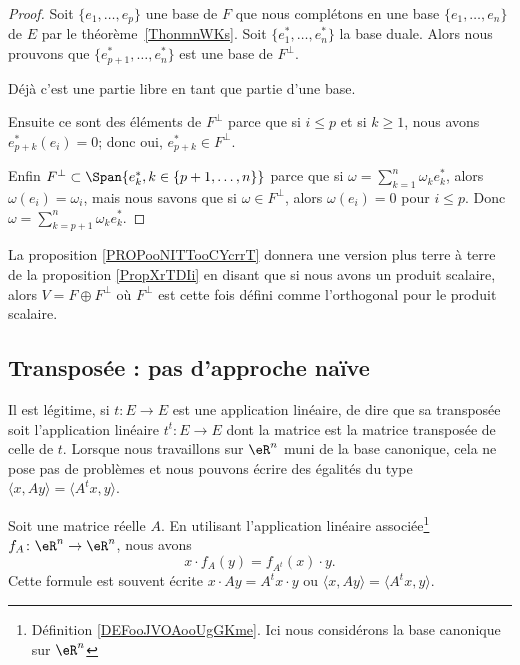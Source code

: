 \begin{proof}
    Soit \( \{ e_1,\ldots, e_p \}\) une base de \( F\) que nous complétons en une base \( \{ e_1,\ldots, e_n \}\) de \( E\) par le théorème~\ref{ThonmnWKs}. Soit \( \{ e_1^*,\ldots, e^*_n \}\) la base duale. Alors nous prouvons que \( \{ e^*_{p+1},\ldots, e_n^* \}\) est une base de \( F^{\perp}\).

    Déjà c'est une partie libre en tant que partie d'une base.

    Ensuite ce sont des éléments de \( F^{\perp}\) parce que si \( i\leq p\) et si \( k\geq 1\), nous avons \( e^*_{p+k}(e_i)=0\); donc oui, \( e^*_{p+k}\in F^{\perp}\).

    Enfin \( F^{\perp}\subset\Span\{ e_{k}^*, k \in \{p+1, \dots, n\}\}\) parce que si \( \omega=\sum_{k=1}^n\omega_ke_k^*\), alors \( \omega(e_i)=\omega_i\), mais nous savons que si \( \omega\in F^{\perp}\), alors \( \omega(e_i)=0\) pour \( i\leq p\). Donc \( \omega=\sum_{k=p+1}^n\omega_ke^*_k\).
\end{proof}

La proposition \ref{PROPooNITTooCYcrrT} donnera une version plus terre à terre de la proposition \ref{PropXrTDIi} en disant que si nous avons un produit scalaire, alors \( V=F\oplus F^{\perp}\) où \( F^{\perp}\) est cette fois défini comme l'orthogonal pour le produit scalaire.

\subsection{Transposée : pas d'approche naïve}
\label{SUBSECooGPXVooEYwIiJ}

Il est légitime, si \( t\colon E\to E\) est une application linéaire, de dire que sa transposée soit l'application linéaire \( t^t\colon E\to E\) dont la matrice est la matrice transposée de celle de \( t\). Lorsque nous travaillons sur \( \eR^n\) muni de la base canonique, cela ne pose pas de problèmes et nous pouvons écrire des égalités du type \( \langle x, Ay\rangle =\langle A^tx, y\rangle \).

\begin{proposition}     \label{PROPooNARVooEuhweD}
    Soit une matrice réelle \( A\). En utilisant l'application linéaire associée\footnote{Définition \ref{DEFooJVOAooUgGKme}. Ici nous considérons la base canonique sur \( \eR^n\)} \( f_A\colon \eR^n\to \eR^n\), nous avons
    \begin{equation}
        x\cdot f_A(y)=f_{A^t}(x)\cdot y.
    \end{equation}
    Cette formule est souvent écrite \( x\cdot Ay=A^tx\cdot y\) ou \( \langle x, Ay\rangle =\langle A^tx, y\rangle \).
\end{proposition}


